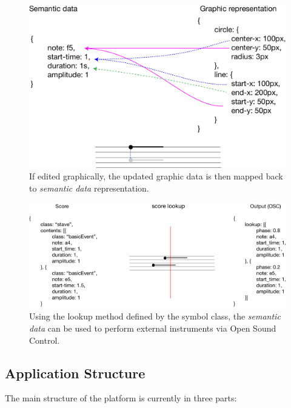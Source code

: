 \documentclass{article}
\begin{document}
\begin{figure}[ht!]
\includegraphics[width=1\columnwidth]{graphic-to-data.pdf}
\caption{If edited graphically, the updated graphic data is then mapped back to \textit{semantic data} representation. 
\label{fig:graphic-to-data}}
\end{figure}

\begin{figure}[ht!]
\includegraphics[width=1\columnwidth]{score-lookup.pdf}
\caption{Using the lookup method defined by the symbol class, the \textit{semantic data} can be used to perform external instruments via Open Sound Control. 
\label{fig:score-lookup}}
\end{figure}



\subsection{Application Structure}\label{subsec:application_structure}

The main structure of the platform is currently in three parts:
\end{document}
